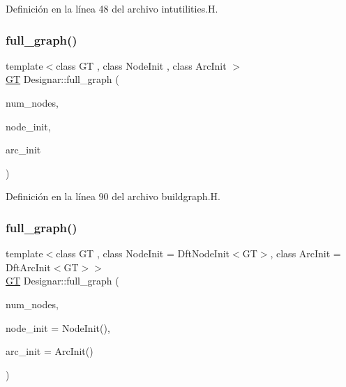 Definición en la línea 48 del archivo intutilities.\+H.

\mbox{\label{namespace_designar_a8d424cb12f90b415f71463d919979437}} 
\subsubsection{\texorpdfstring{full\+\_\+graph()}{full\_graph()}\hspace{0.1cm}{\footnotesize\ttfamily [1/2]}}
{\footnotesize\ttfamily template$<$class GT , class Node\+Init , class Arc\+Init $>$ \\
\hyperlink{demo-buildgraph_8_c_a3001c40d2c31ca87ed96cd7d1334a55e}{GT} Designar\+::full\+\_\+graph (\begin{DoxyParamCaption}\item[{\hyperlink{namespace_designar_aa72662848b9f4815e7bf31a7cf3e33d1}{nat\+\_\+t}}]{num\+\_\+nodes,  }\item[{Node\+Init \&}]{node\+\_\+init,  }\item[{Arc\+Init \&}]{arc\+\_\+init }\end{DoxyParamCaption})}



Definición en la línea 90 del archivo buildgraph.\+H.

\mbox{\label{namespace_designar_aa06a68f735d6f8086fe2c5f4cd8062f1}} 
\subsubsection{\texorpdfstring{full\+\_\+graph()}{full\_graph()}\hspace{0.1cm}{\footnotesize\ttfamily [2/2]}}
{\footnotesize\ttfamily template$<$class GT , class Node\+Init  = Dft\+Node\+Init$<$\+G\+T$>$, class Arc\+Init  = Dft\+Arc\+Init$<$\+G\+T$>$$>$ \\
\hyperlink{demo-buildgraph_8_c_a3001c40d2c31ca87ed96cd7d1334a55e}{GT} Designar\+::full\+\_\+graph (\begin{DoxyParamCaption}\item[{\hyperlink{namespace_designar_aa72662848b9f4815e7bf31a7cf3e33d1}{nat\+\_\+t}}]{num\+\_\+nodes,  }\item[{Node\+Init \&\&}]{node\+\_\+init = {\ttfamily NodeInit()},  }\item[{Arc\+Init \&\&}]{arc\+\_\+init = {\ttfamily ArcInit()} }\end{DoxyParamCaption})}




